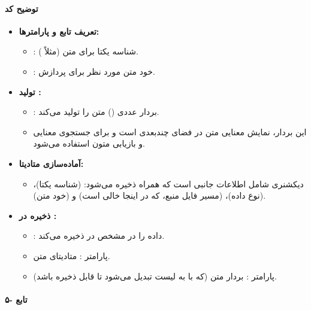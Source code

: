 \documentclass{article}
\begin{document}
\paragraph{توضیح کد }
\begin{itemize}
    \item \textbf{تعریف تابع و پارامترها:}
    \begin{itemize}
        \item {}: شناسه یکتا برای متن (مثلاً ).
        \item {}: خود متن مورد نظر برای پردازش.
    \end{itemize}

    \item \textbf{تولید :}
    \begin{itemize}
        \item {}: بردار عددی () متن را تولید می‌کند.
        \item این بردار، نمایش معنایی متن در فضای چندبعدی است و برای جستجوی معنایی و بازیابی متون استفاده می‌شود.
    \end{itemize}

    \item \textbf{آماده‌سازی متادیتا:}
    \begin{itemize}
        \item دیکشنری  شامل اطلاعات جانبی است که همراه  ذخیره می‌شود:  (شناسه یکتا)،  (نوع داده)،  (مسیر فایل منبع، که در اینجا خالی است) و  (خود متن).
    \end{itemize}

    \item \textbf{ذخیره در :}
    \begin{itemize}
        \item {}: داده را در  مشخص در  ذخیره می‌کند.
        \item پارامتر : متادیتای متن.
        \item پارامتر : بردار  متن (که با  به لیست تبدیل می‌شود تا قابل ذخیره باشد).
    \end{itemize}
\end{itemize}

\paragraph{۵- تابع }
\end{document}
